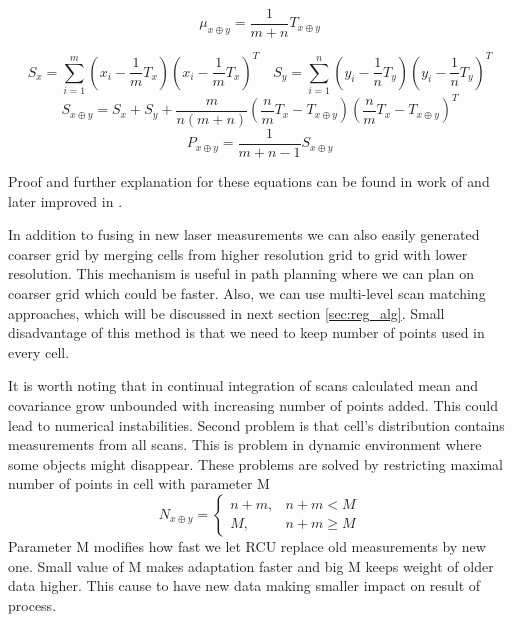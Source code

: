 \begin{equation}
\label{NDT_mean_RCU}
\mu_{x\oplus y} =\dfrac{1}{m + n}T_{x\oplus y}
\end{equation} 

\begin{equation}
S_{x} = \sum_{i=1}^{m}(x_{i} - \frac{1}{m}T_{x})(x_{i} - \frac{1}{m}T_{x})^{T} \quad 
S_{y} = \sum_{i=1}^{n}(y_{i} - \frac{1}{n}T_{y})(y_{i} - \frac{1}{n}T_{y})^{T}
\end{equation}
\begin{equation}
S_{x\oplus y} = S_{x} + S_{y} + \dfrac{m}{n(m+n)}(\frac{n}{m}T_{x} - T_{x\oplus y})(\frac{n}{m}T_{x} - T_{x\oplus y})^{T}
\end{equation}
\begin{equation}
\label{NDT_covar_RCU}
P_{x\oplus y} = \dfrac{1}{m+n -1}S_{x\oplus y}
\end{equation}

Proof and further explanation for these equations can be found in work of \cite{Saarinen13} and later improved in \cite{Saarinen213}.

In addition to fusing in new laser measurements we can also easily generated coarser grid by merging cells from higher resolution grid to grid with lower resolution. This mechanism is useful in path planning where we can plan on coarser grid which could be faster. Also, we can use multi-level scan matching approaches, which will be discussed in next section \ref{sec:reg_alg}. Small disadvantage of this method is that we need to keep number of points used in every cell.

It is worth noting that in continual integration of scans calculated mean and covariance grow unbounded with increasing number of points added. This could lead to numerical instabilities. Second problem is that cell's distribution contains measurements from all scans. This is problem in dynamic environment where some objects might disappear. These problems are solved by restricting maximal number of points in cell with parameter M
\begin{equation}
N_{x \oplus y} = 
\begin{cases}
n+m, & n+m < M \\
M, & n+m \geq M
\end{cases} 
\end{equation}
Parameter M modifies how fast we let RCU replace old measurements by new one. Small value of M makes adaptation faster and big M keeps weight of older data higher. This cause to have new data making smaller impact on result of process. 

